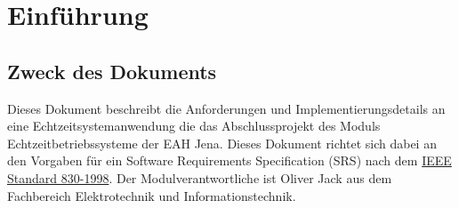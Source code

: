 \section{Einführung}
\subsection{Zweck des Dokuments}
Dieses Dokument beschreibt die Anforderungen und Implementierungsdetails an eine Echtzeitsystemanwendung die das Abschlussprojekt des Moduls Echtzeitbetriebssysteme der EAH Jena. Dieses Dokument richtet sich dabei an den Vorgaben für ein Software Requirements Specification (SRS) nach dem \href{https://de.wikipedia.org/wiki/Software_Requirements_Specification}{IEEE Standard 830-1998}. Der Modulverantwortliche ist Oliver Jack aus dem Fachbereich Elektrotechnik und Informationstechnik.